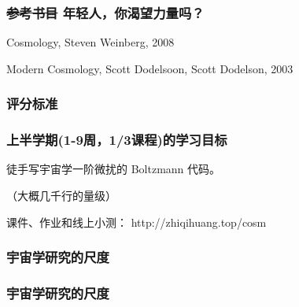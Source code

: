\documentclass[CJK,13pt]{beamer}
\date{}
\begin{document}
  \bch
{}


\begin{frame}
\frametitle{\sout{参考书目} 年轻人，你渴望力量吗？}
\bitem
\item{Cosmology, Steven Weinberg, 2008}
\item{Modern Cosmology, Scott Dodelsoon, Scott Dodelson, 2003}
\eitem
      
\end{frame}




\begin{frame}
\frametitle{评分标准}


\end{frame}


\begin{frame}
\frametitle{上半学期(1-9周，1/3课程)的学习目标}

徒手写宇宙学一阶微扰的 Boltzmann 代码。

（大概几千行的量级）

\skiplines

课件、作业和线上小测： http://zhiqihuang.top/cosm
\end{frame}


\begin{frame}
  \frametitle{宇宙学研究的尺度}
\end{frame}


\begin{frame}
  \frametitle{宇宙学研究的尺度}
\end{frame}

\ech
\end{document}
